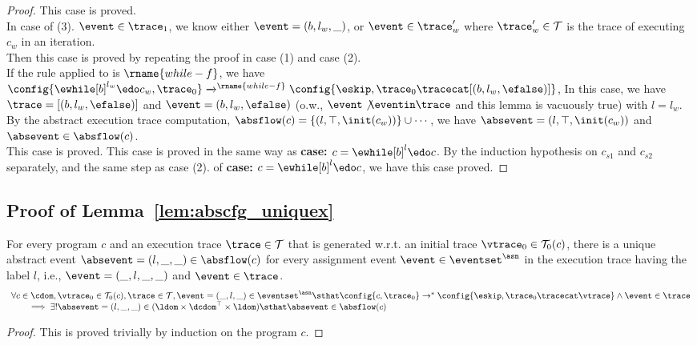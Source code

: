 \begin{proof}
  This case is proved.
  \\
In case of (3). $\event \in \trace_1$, we know either $\event = (b, l_w, \_)$, or $\event \in \trace_w'$ where $\trace_w' \in \mathcal{T}$ is the trace of executing $c_w$ in an iteration.
\\
Then this case is proved by repeating the proof in case (1) and case (2).
  \\
  If the rule applied to is $\rname{while-f}$, we have
  \\
  $
  {
    \config{{\ewhile [b]^{l_w} \edo c_w, \trace_0}}
    \xrightarrow{}^\rname{while-f}
    \config{{
    \eskip,
    \trace_0 \tracecat [(b, l_w, \efalse)]}}
  }$,
  In this case, we have $\trace = [(b, l_w, \efalse)]$ and $\event = (b, l_w, \efalse)$ (o.w., $\event \not\eventin \trace$ and this lemma is vacuously true) with $l = l_w$.
  \\
  By the abstract execution trace computation, $\absflow(c) = \{(l, \top, \init(c_w))\} \cup \cdots $, 
  we have $\absevent = (l, \top, \init(c_w))$  and $\absevent \in \absflow(c)$.
\\
  This case is proved.
  This case is proved in the same way as \textbf{case: $c = \ewhile [b]^{l} \edo c$}.
 By the induction hypothesis on $c_{s1}$ and $c_{s2}$ separately, and the same step as case (2). of \textbf{case: $c = \ewhile [b]^{l} \edo c$},
 we have this case proved.
\end{proof}

\subsection{Proof of Lemma~\ref{lem:abscfg_uniquex}}
\label{apdx:abscfg_uniquex}
\begin{lemma}
  For every program $c$ and
  an execution trace $\trace \in \mathcal{T}$ that is generated w.r.t.
  an initial trace  $\vtrace_0 \in \mathcal{T}_0(c)$,
  there is a unique abstract event $\absevent = (l, \_, \_) \in \absflow(c)$ 
  for every assignment event $\event \in \eventset^{\asn}$ in the
  execution trace having the label $l$, i.e., $\event = (\_, l, \_, \_)$ and  $\event \in \trace$.
%
\[
  \begin{array}{l}
    \forall c \in \cdom, \vtrace_0 \in \mathcal{T}_0(c), \trace \in \mathcal{T} ,  \event = (\_, l, \_) \in \eventset^{\asn} \sthat 
\config{{c}, \trace_0} \to^{*} \config{\eskip, \trace_0 \tracecat \vtrace} 
\land \event \in \trace 
\\
\qquad \implies \exists! \absevent = (l, \_, \_) \in (\ldom\times \dcdom^{\top} \times \ldom) \sthat  
\absevent \in \absflow(c)
\end{array}
\]
\end{lemma}
\begin{proof}
  This is proved trivially by induction on the program $c$.
\end{proof}
%
%

